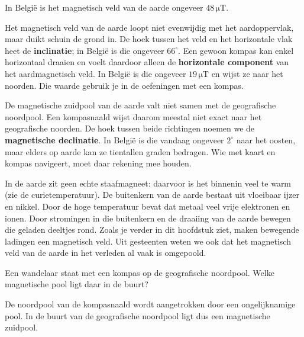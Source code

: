 \documentclass{ximera}
\begin{document}
In België is het magnetisch veld van de aarde ongeveer $48\,\mathrm{\mu T}$.

\begin{remark}[expandable=true,title={Inclinatie en horizontale component}]\nl
    Het magnetisch veld van de aarde loopt niet evenwijdig met het aardoppervlak, maar duikt schuin de grond in. De hoek tussen het veld en het horizontale vlak heet de \textbf{inclinatie}; in België is die ongeveer $66^\circ$. Een gewoon kompas kan enkel horizontaal draaien en voelt daardoor alleen de \textbf{horizontale component} van het aardmagnetisch veld. In België is die ongeveer $19\,\mathrm{\mu T}$ en wijst ze naar het noorden. Die waarde gebruik je in de oefeningen met een kompas.
\end{remark}

\begin{remark}[expandable=true,title={Extra: magnetische declinatie}]\nl
    De magnetische zuidpool van de aarde valt niet samen met de geografische noordpool. Een kompasnaald wijst daarom meestal niet exact naar het geografische noorden. De hoek tussen beide richtingen noemen we de \textbf{magnetische declinatie}. In België is die vandaag ongeveer $2^\circ$ naar het oosten, maar elders op aarde kan ze tientallen graden bedragen. Wie met kaart en kompas navigeert, moet daar rekening mee houden.
\end{remark}

\begin{remark}[expandable=true,title={Extra: waar komt het aardmagnetisch veld vandaan?}]\nl
    In de aarde zit geen echte staafmagneet: daarvoor is het binnenin veel te warm (zie de curietemperatuur). De buitenkern van de aarde bestaat uit vloeibaar ijzer en nikkel. Door de hoge temperatuur bevat dat metaal veel vrije elektronen en ionen. Door stromingen in die buitenkern en de draaiing van de aarde bewegen die geladen deeltjes rond. Zoals je verder in dit hoofdstuk ziet, maken bewegende ladingen een magnetisch veld. Uit gesteenten weten we ook dat het magnetisch veld van de aarde in het verleden al vaak is omgepoold.
\end{remark}

\begin{question}
    Een wandelaar staat met een kompas op de geografische noordpool. Welke magnetische pool ligt daar in de buurt?

    \begin{multipleChoice}
    \end{multipleChoice}

    \begin{solution}\nl
        De noordpool van de kompasnaald wordt aangetrokken door een ongelijknamige pool. In de buurt van de geografische noordpool ligt dus een magnetische zuidpool.
    \end{solution}
\end{question}
\end{document}

